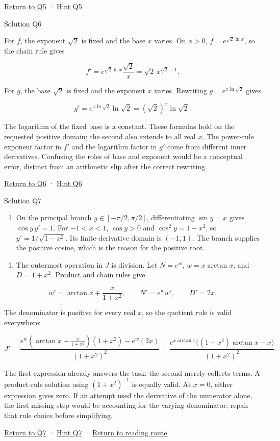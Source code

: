 \documentclass[
  11pt,
]{article}
\providecommand{\tightlist}{%
  \setlength{\itemsep}{0pt}\setlength{\parskip}{0pt}}
\providecommand{\gt}{>}
\providecommand{\lt}{<}
\begin{document}
\protect\hyperlink{task-q5}{Return to Q5} ·
\protect\hyperlink{hint-q5}{Hint Q5}

Solution Q6

For \(f\), the exponent \(\sqrt2\) is fixed and the base \(x\) varies.
On \(x\gt 0\), \(f=e^{\sqrt2\ln x}\), so the chain rule gives

\[f'=e^{\sqrt2\ln x}\frac{\sqrt2}{x}=\sqrt2\,x^{\sqrt2-1}.\]

For \(g\), the base \(\sqrt2\) is fixed and the exponent \(x\) varies.
Rewriting \(g=e^{x\ln\sqrt2}\) gives

\[g'=e^{x\ln\sqrt2}\ln\sqrt2=(\sqrt2)^x\ln\sqrt2.\]

The logarithm of the fixed base is a constant. These formulas hold on
the requested positive domain; the second also extends to all real
\(x\). The power-rule exponent factor in \(f'\) and the logarithm factor
in \(g'\) come from different inner derivatives. Confusing the roles of
base and exponent would be a conceptual error, distinct from an
arithmetic slip after the correct rewriting.

\protect\hyperlink{task-q6}{Return to Q6} ·
\protect\hyperlink{hint-q6}{Hint Q6}

Solution Q7

\begin{enumerate}
\def\labelenumi{(\alph{enumi})}
\tightlist
\item
  On the principal branch \(y\in[-\pi/2,\pi/2]\), differentiating
  \(\sin y=x\) gives \(\cos y\,y'=1\). For \(-1\lt x\lt 1\),
  \(\cos y\gt 0\) and \(\cos^2y=1-x^2\), so \(y'=1/\sqrt{1-x^2}\). Its
  finite-derivative domain is \((-1,1)\). The branch supplies the
  positive cosine, which is the reason for the positive root.
\end{enumerate}

\begin{enumerate}
\def\labelenumi{(\alph{enumi})}
\setcounter{enumi}{1}
\tightlist
\item
  The outermost operation in \(J\) is division. Let \(N=e^w\),
  \(w=x\arctan x\), and \(D=1+x^2\). Product and chain rules give
\end{enumerate}

\[w'=\arctan x+\frac{x}{1+x^2},
\qquad N'=e^ww',\qquad D'=2x.\]

The denominator is positive for every real \(x\), so the quotient rule
is valid everywhere:

\[J'=\frac{e^w\left(\arctan x+\frac{x}{1+x^2}\right)(1+x^2)-e^w(2x)}{(1+x^2)^2}
=\frac{e^{x\arctan x}\big((1+x^2)\arctan x-x\big)}{(1+x^2)^2}.\]

The first expression already answers the task; the second merely
collects terms. A product-rule solution using \((1+x^2)^{-1}\) is
equally valid. At \(x=0\), either expression gives zero. If an attempt
used the derivative of the numerator alone, the first missing step would
be accounting for the varying denominator; repair that rule choice
before simplifying.

\protect\hyperlink{task-q7}{Return to Q7} ·
\protect\hyperlink{hint-q7}{Hint Q7} · \protect\hyperlink{route}{Return
to reading route}
\end{document}
